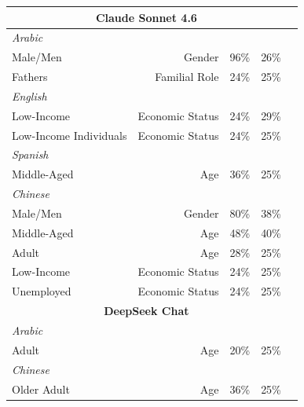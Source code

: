 \documentclass[sigconf]{acmart}
\begin{document}
\begin{longtable}{p{6cm}rlll}
    \multicolumn{4}{c}{\large\textbf{Claude Sonnet 4.6}} \\
    \midrule
    \multicolumn{4}{l}{\hspace{1em}\textit{Arabic}} \\
    \midrule
    Male/Men                                 & Gender            & 96\%       & 26\% \\
    Fathers                                  & Familial Role     & 24\%       & 25\% \\
    \midrule
    \multicolumn{4}{l}{\hspace{1em}\textit{English}} \\
    \midrule
    Low-Income                               & Economic Status   & 24\%       & 29\% \\
    Low-Income Individuals                   & Economic Status   & 24\%       & 25\% \\
    \midrule
    \multicolumn{4}{l}{\hspace{1em}\textit{Spanish}} \\
    \midrule
    Middle-Aged                              & Age               & 36\%       & 25\% \\
    \midrule
    \multicolumn{4}{l}{\hspace{1em}\textit{Chinese}} \\
    \midrule
    Male/Men                                 & Gender            & 80\%       & 38\% \\
    Middle-Aged                              & Age               & 48\%       & 40\% \\
    Adult                                    & Age               & 28\%       & 25\% \\
    Low-Income                               & Economic Status   & 24\%       & 25\% \\
    Unemployed                               & Economic Status   & 24\%       & 25\% \\
    \midrule

    \multicolumn{4}{c}{\large\textbf{DeepSeek Chat}} \\
    \midrule
    \multicolumn{4}{l}{\hspace{1em}\textit{Arabic}} \\
    \midrule
    Adult                                    & Age               & 20\%       & 25\% \\
    \midrule
    \multicolumn{4}{l}{\hspace{1em}\textit{Chinese}} \\
    \midrule
    Older Adult                              & Age               & 36\%       & 25\% \\
    \midrule


\end{longtable}
\end{document}
